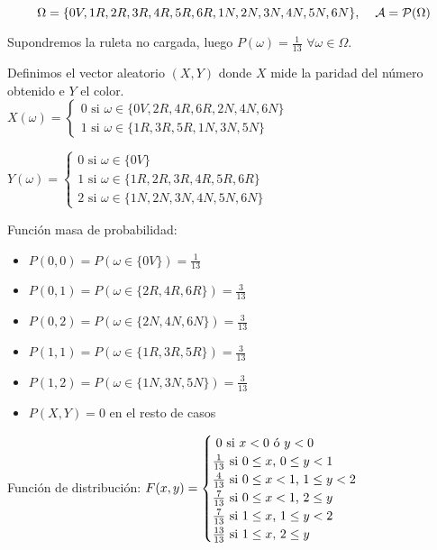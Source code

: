 \documentclass{article}
\begin{document}
\[\Omega = \{0V, 1R, 2R, 3R, 4R, 5R, 6R, 1N, 2N, 3N, 4N, 5N, 6N\}, \hspace{4mm} \mathcal{A} = \mathcal{P}(\Omega)\]

Supondremos la ruleta no cargada, luego $P(\omega)=\frac{1}{13}$ $\forall \omega \in \Omega$.

Definimos el vector aleatorio $(X,Y)$ donde $X$ mide la paridad del número obtenido e $Y$ el color. \\

$X(\omega)=
\begin{cases}
  0 \text{ si } \omega \in \{0V,2R,4R,6R,2N,4N,6N\} \\
  1 \text{ si } \omega \in \{1R,3R,5R,1N,3N,5N\}
\end{cases}
$

\vspace{4mm}

$Y(\omega)=
\begin{cases}
  0 \text{ si } \omega \in \{0V\} \\
  1 \text{ si } \omega \in \{1R,2R,3R,4R,5R,6R\} \\
  2 \text{ si } \omega \in \{1N,2N,3N,4N,5N,6N\}
\end{cases}
$

\newpage

Función masa de probabilidad: 
\begin{itemize}
\item $P(0,0)=P(\omega \in \{0V\}) = \frac{1}{13}$
\item $P(0,1)=P(\omega \in \{2R,4R,6R\}) = \frac{3}{13}$
\item $P(0,2)=P(\omega \in \{2N,4N,6N\}) = \frac{3}{13}$
\item $P(1,1)=P(\omega \in \{1R,3R,5R\}) = \frac{3}{13}$
\item $P(1,2)=P(\omega \in \{1N,3N,5N\}) = \frac{3}{13}$
\item $P(X,Y)=0$ en el resto de casos
\end{itemize}

Función de distribución:
$F(x,y)=
\begin{cases}
  \hspace{1mm }0 \text{\hspace{1.2mm}si $x < 0$ ó $y < 0$} \\
  \frac{1}{13} \text{ si $0\leq x$, $0\leq y < 1$} \\
  \frac{4}{13} \text{ si $0\leq x < 1$, $1\leq y < 2$} \\
  \frac{7}{13} \text{ si $0\leq x < 1$, $2\leq y$} \\
  \frac{7}{13} \text{ si $1\leq x$, $1\leq y < 2$} \\
  \frac{13}{13} \text{ si $1\leq x$, $2\leq y$}
\end{cases}
$
\end{document}

